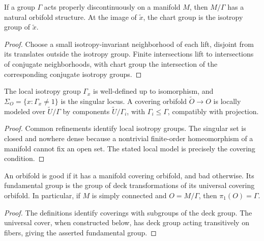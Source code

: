 \begin{proposition}
\label{thurston-ch13-quotient-orbifold}

If a group $\Gamma$ acts properly discontinuously on a manifold $M$, then
$M/\Gamma$ has a natural orbifold structure.  At the image of $\widetilde x$,
the chart group is the isotropy group of $\widetilde x$.
\end{proposition}
\begin{proof}
\sketch Choose a small isotropy-invariant neighborhood of each lift, disjoint
from its translates outside the isotropy group.  Finite intersections lift to
intersections of conjugate neighborhoods, with chart group the intersection of
the corresponding conjugate isotropy groups.
\end{proof}

\begin{definition}
\label{thurston-ch13-singular-covering}

The local isotropy group $\Gamma_x$ is well-defined up to isomorphism, and
$\Sigma_O=\{x:\Gamma_x\ne1\}$ is the singular locus.  A covering orbifold
$\widetilde O\to O$ is locally modeled over $\widetilde U/\Gamma$ by components
$\widetilde U/\Gamma_i$, with $\Gamma_i\leq\Gamma$, compatibly with projection.
\end{definition}
\begin{proof}
\sketch Common refinements identify local isotropy groups.  The singular set is
closed and nowhere dense because a nontrivial finite-order homeomorphism of a
manifold cannot fix an open set.  The stated local model is precisely the
covering condition.
\end{proof}

\begin{definition}
\label{thurston-ch13-good-orbifold}

An orbifold is good if it has a manifold covering orbifold, and bad otherwise.
Its fundamental group is the group of deck transformations of its universal
covering orbifold.  In particular, if $M$ is simply connected and $O=M/\Gamma$,
then $\pi_1(O)=\Gamma$.
\end{definition}
\begin{proof}
\sketch The definitions identify coverings with subgroups of the deck group.
The universal cover, when constructed below, has deck group acting transitively
on fibers, giving the asserted fundamental group.
\end{proof}

